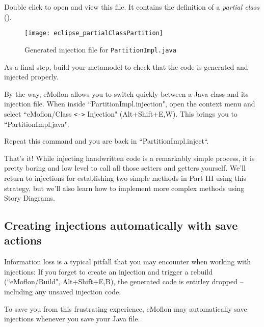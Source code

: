 \begin{stepbystep}
\item Double click to open and view this file. It contains the definition of a \textit{partial class}
().

\begin{figure}[htbp]
    \centering
    \texttt{[image: eclipse\_partialClassPartition]}
    \caption{Generated injection file for \texttt{PartitionImpl.java}}
    \label{eclipse:injection_partialClassPartition}
\end{figure}

\clearpage

\item As a final step, build your metamodel to check that the code is generated and injected properly.

\item By the way, eMoflon allows you to switch quickly between a Java class and its injection file.
When inside ``PartitionImpl.injection", open the context menu and select ``eMoflon/Class \verb|<->| Injection" (Alt+Shift+E,W).
This brings you to ``PartitionImpl.java".

Repeat this command and you are back in ``PartitionImpl.inject``.


\item That's it! While injecting handwritten code is a remarkably simple process, it is pretty boring and low level to call all those
setters and getters yourself. We'll return to injections for establishing two simple methods in Part III using this strategy, but we'll also learn how to
implement more complex methods using Story Diagrams.
 
\end{stepbystep}

\subsection*{Creating injections automatically with save actions}

Information loss is a typical pitfall that you may encounter when working with injections:
If you forget to create an injection and trigger a rebuild (``eMoflon/Build", Alt+Shift+E,B), the generated code is entirley dropped -- including any unsaved injection code.

To save you from this frustrating experience, eMoflon may automatically save injections whenever you save your Java file.

